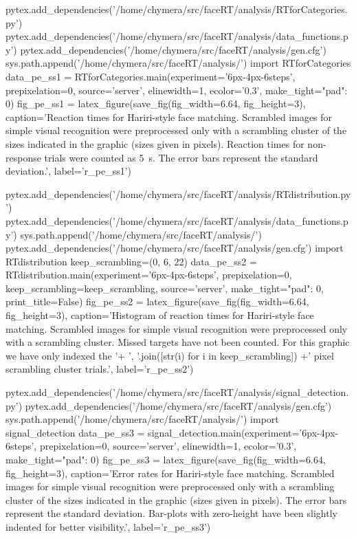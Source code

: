 \begin{pycode}[pe_ss1]
pytex.add_dependencies('/home/chymera/src/faceRT/analysis/RTforCategories.py')
pytex.add_dependencies('/home/chymera/src/faceRT/analysis/data_functions.py')
pytex.add_dependencies('/home/chymera/src/faceRT/analysis/gen.cfg')
sys.path.append('/home/chymera/src/faceRT/analysis/')
import RTforCategories
data_pe_ss1 = RTforCategories.main(experiment='6px-4px-6steps', prepixelation=0, source='server', elinewidth=1, ecolor='0.3', make_tight={"pad": 0})
fig_pe_ss1 = latex_figure(save_fig(fig_width=6.64, fig_height=3), caption='Reaction times for Hariri-style face matching. Scrambled images for simple visual recognition were preprocessed only with a scrambling cluster of the sizes indicated in the graphic (sizes given in pixels). Reaction times for non-response trials were counted as \SI{5}{\second}. The error bars represent the standard deviation.', label='r_pe_ss1')
\end{pycode}
\begin{pycode}
pytex.add_dependencies('/home/chymera/src/faceRT/analysis/RTdistribution.py')
pytex.add_dependencies('/home/chymera/src/faceRT/analysis/data_functions.py')
sys.path.append('/home/chymera/src/faceRT/analysis/')
pytex.add_dependencies('/home/chymera/src/faceRT/analysis/gen.cfg')
import RTdistribution
keep_scrambling=(0, 6, 22)
data_pe_ss2 = RTdistribution.main(experiment='6px-4px-6steps', prepixelation=0, keep_scrambling=keep_scrambling, source='server', make_tight={"pad": 0}, print_title=False)
fig_pe_ss2 = latex_figure(save_fig(fig_width=6.64, fig_height=3), caption='Histogram of reaction times for Hariri-style face matching. Scrambled images for simple visual recognition were preprocessed only with a scrambling cluster. Missed targets have not been counted. For this graphic we have only indexed the '+ ', '.join([str(i) for i in keep_scrambling]) +' pixel scrambling cluster trials.', label='r_pe_ss2')
\end{pycode}
\begin{pycode}[pe_ss3]
pytex.add_dependencies('/home/chymera/src/faceRT/analysis/signal_detection.py')
pytex.add_dependencies('/home/chymera/src/faceRT/analysis/gen.cfg')
sys.path.append('/home/chymera/src/faceRT/analysis/')
import signal_detection
data_pe_ss3 = signal_detection.main(experiment='6px-4px-6steps', prepixelation=0, source='server', elinewidth=1, ecolor='0.3', make_tight={"pad": 0})
fig_pe_ss3 = latex_figure(save_fig(fig_width=6.64, fig_height=3), caption='Error rates for Hariri-style face matching. Scrambled images for simple visual recognition were preprocessed only with a scrambling cluster of the sizes indicated in the graphic (sizes given in pixels). The error bars represent the standard deviation. Bar-plots with zero-height have been slightly indented for better visibility.', label='r_pe_ss3')
\end{pycode}
